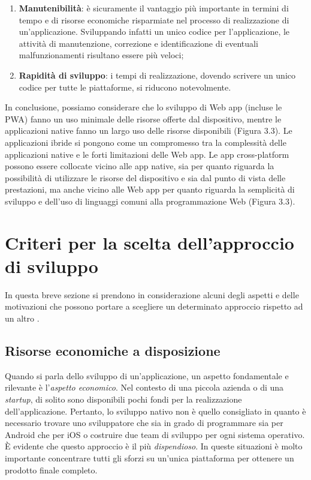 \begin{enumerate}
	\item \textbf{Manutenibilità}: è sicuramente il vantaggio più importante in termini di tempo e di risorse economiche risparmiate nel processo di realizzazione di un’applicazione. Sviluppando infatti un unico codice per l’applicazione, le attività di manutenzione, correzione e identificazione di eventuali malfunzionamenti risultano essere più veloci;
	\item \textbf{Rapidità di sviluppo}: i tempi di realizzazione, dovendo scrivere un unico codice per tutte le piattaforme, si riducono notevolmente.
\end{enumerate}

In conclusione, possiamo considerare che lo sviluppo di Web app (incluse le PWA) fanno un uso minimale delle risorse offerte dal dispositivo, mentre le applicazioni native fanno un largo uso delle risorse disponibili (Figura 3.3). Le applicazioni ibride si pongono come un compromesso tra la complessità delle applicazioni native e le forti limitazioni delle Web app. Le app cross-platform possono essere collocate vicino alle app native, sia per quanto riguarda la possibilità di utilizzare le risorse del dispositivo e sia dal punto di vista delle prestazioni, ma anche vicino alle Web app per quanto riguarda la semplicità di sviluppo e dell'uso di linguaggi comuni alla programmazione Web (Figura 3.3).

\section{Criteri per la scelta dell'approccio di sviluppo}
In questa breve sezione si prendono in considerazione alcuni degli aspetti e delle motivazioni che possono portare a scegliere un determinato approccio rispetto ad un altro \cite{considerazioni_native_hybrid_cross_platform}.

\subsection{Risorse economiche a disposizione}
Quando si parla dello sviluppo di un'applicazione, un aspetto fondamentale e rilevante è l'\textit{aspetto economico}. Nel contesto di una piccola azienda o di una \textit{startup}, di solito sono disponibili pochi fondi per la realizzazione dell'applicazione. Pertanto, lo sviluppo nativo non è quello consigliato in quanto è necessario trovare uno sviluppatore che sia in grado di programmare sia per Android che per iOS o costruire due team di sviluppo per ogni sistema operativo. È evidente che questo approccio è il più \textit{dispendioso}. In queste situazioni è molto importante concentrare tutti gli sforzi su un'unica piattaforma per ottenere un prodotto finale completo.

